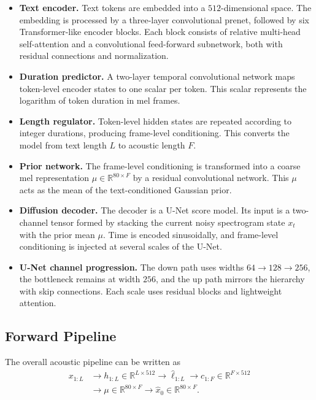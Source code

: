 \documentclass[11pt,a4paper]{article}
\newcommand{\R}{\mathbb{R}}
\begin{document}
\begin{itemize}
\item \textbf{Text encoder.} Text tokens are embedded into a $512$-dimensional space. The embedding is processed by a three-layer convolutional prenet, followed by six Transformer-like encoder blocks. Each block consists of relative multi-head self-attention and a convolutional feed-forward subnetwork, both with residual connections and normalization.

\item \textbf{Duration predictor.} A two-layer temporal convolutional network maps token-level encoder states to one scalar per token. This scalar represents the logarithm of token duration in mel frames.

\item \textbf{Length regulator.} Token-level hidden states are repeated according to integer durations, producing frame-level conditioning. This converts the model from text length $L$ to acoustic length $F$.

\item \textbf{Prior network.} The frame-level conditioning is transformed into a coarse mel representation $\mu \in \R^{80\times F}$ by a residual convolutional network. This $\mu$ acts as the mean of the text-conditioned Gaussian prior.

\item \textbf{Diffusion decoder.} The decoder is a U-Net score model. Its input is a two-channel tensor formed by stacking the current noisy spectrogram state $x_t$ with the prior mean $\mu$. Time is encoded sinusoidally, and frame-level conditioning is injected at several scales of the U-Net.

\item \textbf{U-Net channel progression.} The down path uses widths $64 \rightarrow 128 \rightarrow 256$, the bottleneck remains at width $256$, and the up path mirrors the hierarchy with skip connections. Each scale uses residual blocks and lightweight attention.
\end{itemize}

\subsection{Forward Pipeline}

The overall acoustic pipeline can be written as
\[
\begin{aligned}
x_{1:L}
&\longrightarrow
h_{1:L}\in\R^{L\times 512}
\longrightarrow
\hat{\ell}_{1:L}
\longrightarrow
c_{1:F}\in\R^{F\times 512}
\\
&\longrightarrow
\mu\in\R^{80\times F}
\longrightarrow
\hat{x}_0\in\R^{80\times F}.
\end{aligned}
\]
\end{document}
